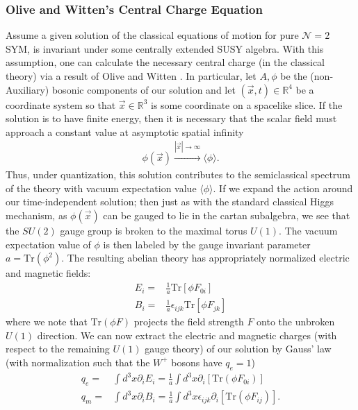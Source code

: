 \documentclass[12pt, onecolumn]{article}
\begin{document}
\subsubsection{Olive and Witten's Central Charge Equation}
\label{sec_olivewitten}
Assume a given solution of the classical equations of motion for pure $\mathcal{N}=2$ SYM, is invariant under some centrally extended SUSY algebra.  With this assumption, one can calculate the necessary central charge (in the classical theory) via a result of Olive and Witten \cite{Olive_Witten}.  In particular, let $A,\phi$ be the (non-Auxiliary) bosonic components of our solution and let $(\vec{x},t) \in \mathbb{R}^{4}$ be a coordinate system so that $\vec{x} \in \mathbb{R}^{3}$ is some coordinate on a spacelike slice.  If the solution is to have finite energy, then it is necessary that the scalar field must approach a constant value at asymptotic spatial infinity
\begin{align*}
\phi(\vec{x}) \overset{|\vec{x}| \rightarrow \infty}{\longrightarrow} \langle \phi \rangle.
\end{align*}
Thus, under quantization, this solution contributes to the semiclassical spectrum of the theory with vacuum expectation value $\langle \phi \rangle$.  If we expand the action around our time-independent solution; then just as with the standard classical Higgs mechanism, as $\phi(\vec{x})$ can be gauged to lie in the cartan subalgebra, we see that the $SU(2)$ gauge group is broken to the maximal torus $U(1)$.  The vacuum expectation value of $\phi$ is then labeled by the gauge invariant parameter $a=\text{Tr}(\phi^2)$. The resulting abelian theory has appropriately normalized electric and magnetic fields:
\begin{align*}
E_{i}=&\frac{1}{a}\text{Tr}\left[\phi F_{0i}\right]\\
B_{i}=&\frac{1}{a}\epsilon_{ijk}\text{Tr}\left[\phi F_{jk}\right]
\end{align*}
where we note that $\text{Tr}(\phi F)$ projects the field strength $F$ onto the unbroken $U(1)$ direction.  We can now extract the electric and magnetic charges (with respect to the remaining $U(1)$ gauge theory) of our solution by Gauss' law (with normalization such that the $W^{+}$ bosons have $q_{e}=1$)
\begin{align*}
q_{e}=&\int d^3x \partial_{i} E_{i}=\frac{1}{a}\int d^3x \partial_{i}\left[\text{Tr}\left(\phi F_{0i}\right)\right]\\
q_{m}=&\int d^3x \partial_{i} B_{i}=\frac{1}{a}\int d^3x \epsilon_{ijk}\partial_{i}\left[\text{Tr}\left(\phi F_{ij}\right)\right].
\end{align*}
\end{document}
